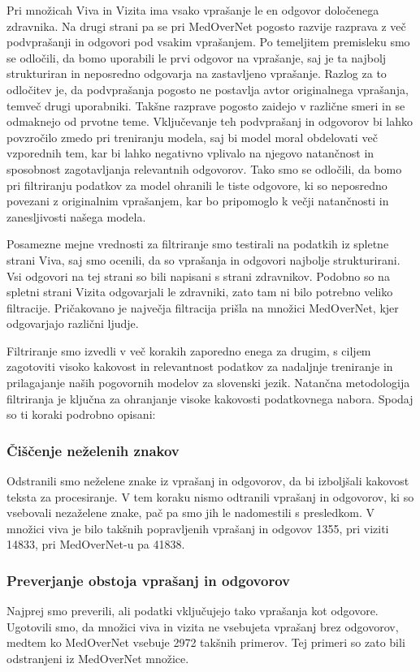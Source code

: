 \documentclass[fleqn,moreauthors,10pt]{ds_report}
\begin{document}
Pri množicah Viva in Vizita ima vsako vprašanje le en odgovor določenega zdravnika. Na drugi strani pa se pri MedOverNet pogosto razvije razprava z več podvprašanji in odgovori pod vsakim vprašanjem. Po temeljitem premisleku smo se odločili, da bomo uporabili le prvi odgovor na vprašanje, saj je ta najbolj strukturiran in neposredno odgovarja na zastavljeno vprašanje.
Razlog za to odločitev je, da podvprašanja pogosto ne postavlja avtor originalnega vprašanja, temveč drugi uporabniki. Takšne razprave pogosto zaidejo v različne smeri in se odmaknejo od prvotne teme. Vključevanje teh podvprašanj in odgovorov bi lahko po\-vzr\-oč\-ilo zmedo pri treniranju modela, saj bi model moral obdelovati več vzporednih tem, kar bi lahko negativno vplivalo na njegovo natančnost in sposobnost zagotavljanja relevantnih odgovorov.
Tako smo se odločili, da bomo pri filtriranju podatkov za model ohranili le tiste odgovore, ki so neposredno povezani z originalnim vprašanjem, kar bo pripomoglo k večji natančnosti in zanesljivosti našega modela.

Posamezne mejne vrednosti za filtriranje smo testirali na podatkih iz spletne strani Viva, saj smo ocenili, da so vprašanja in odgovori najbolje strukturirani. Vsi odgovori na tej strani so bili napisani s strani zdravnikov. Podobno so na spletni strani Vizita odgovarjali le zdravniki, zato tam ni bilo potrebno veliko filtracije. Pričakovano je največja filtracija prišla na množici MedOverNet, kjer odgovarjajo različni ljudje.

Filtriranje smo izvedli v več korakih zaporedno enega za drugim, s ciljem zagotoviti visoko kakovost in relevantnost podatkov za nadaljnje treniranje in prilagajanje naših pogovornih modelov za slovenski jezik. Natančna metodologija filtriranja je ključna za ohranjanje visoke kakovosti podatkovnega nabora.
Spodaj so ti koraki podrobno opisani:

\subsubsection*{Čiščenje neželenih znakov}
Odstranili smo neželene znake iz vprašanj in odgovorov, da bi izboljšali kakovost teksta za procesiranje. V tem koraku nismo odtranili vprašanj in odgovorov, ki so vsebovali nezaželene znake, pač pa smo jih le nadomestili s presledkom. V množici viva je bilo takšnih popravljenih vprašanj in odgovov 1355, pri viziti 14833, pri MedOverNet-u pa 41838.

\subsubsection*{Preverjanje obstoja vprašanj in odgovorov}
Najprej smo preverili, ali podatki vključujejo tako vprašanja kot odgovore. Ugotovili smo, da množici viva in vizita ne vsebujeta vprašanj brez odgovorov, medtem ko MedOverNet vsebuje 2972 takšnih primerov. Tej primeri so zato bili odstranjeni iz MedOverNet množice.
\end{document}
